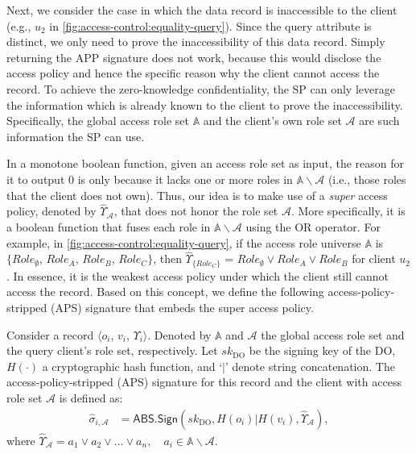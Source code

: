 Next, we consider the case in which the data record is inaccessible to the client (e.g., $u_2$ in \cref{fig:access-control:equality-query}). Since the query attribute is distinct, we only need to prove the inaccessibility of this data record. Simply returning the APP signature does not work, because this would disclose the access policy and hence the specific reason why the client cannot access the record. To achieve the zero-knowledge confidentiality, the SP can only leverage the information which is already known to the client to prove the inaccessibility. Specifically, the global access role set $\mathbb{A}$ and the client's own role set $\mathcal{A}$ are such information the SP can use.

In a monotone boolean function, given an access role set as input, the reason for it to output 0 is only because it lacks one or more roles in $\mathbb{A}\backslash\mathcal{A}$ (i.e., those roles that the client does not own). Thus, our idea is to make use of a \emph{super} access policy, denoted by $\hat{\Upsilon}_{\mathcal{A}}$, that does not honor the role set $\mathcal{A}$. More specifically, it is a boolean function that fuses each role in $\mathbb{A}\backslash\mathcal{A}$ using the OR operator. For example, in \cref{fig:access-control:equality-query}, if the access role universe $\mathbb{A}$ is $\{{Role}_{\emptyset}$, ${Role}_A$, ${Role}_B$, ${Role}_C\}$,
then
$\hat{\Upsilon}_{\{{Role}_C \}}$ = ${Role}_{\emptyset} \lor {Role}_A \lor {Role}_B$ for client $u_2$. In essence, it is the weakest access policy under which the client still cannot access the record. Based on this concept, we define the following access-policy-stripped (APS) signature that embeds the super access policy.

\begin{definition}
  Consider a record $\langle o_i$, $v_i$, $\Upsilon_i\rangle$. Denoted by $\mathbb{A}$ and $\mathcal{A}$ the global access role set and the query client's role set, respectively. Let ${sk}_{\textrm{DO}}$ be the signing key of the DO, $H(\cdot)$ a cryptographic hash function, and `$|$' denote string concatenation. The access-policy-stripped (APS) signature for this record and the client with access role set $\mathcal{A}$ is defined as:
  \begin{align*}
    \hat{\sigma}_{i, \mathcal{A}} & = \textsf{ABS.Sign}({sk}_{\textrm{DO}}, H(o_i) | H(v_i) , \hat{\Upsilon}_{\mathcal{A}}),
  \end{align*}
  where $\hat{\Upsilon}_{\mathcal{A}} = a_1 \lor a_2 \lor \dots \lor a_n, \quad a_i \in \mathbb{A}\backslash\mathcal{A}$.
\end{definition}


